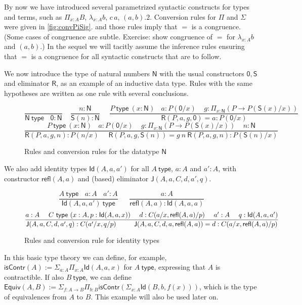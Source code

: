 \documentclass[11pt,a4paper]{article}
\theoremstyle{definition}
\newcommand{\Id}{\mathsf{Id}}
\newcommand{\NN}{\mathsf{N}}
\newcommand{\JJ}{\mathsf{J}}
\newcommand{\ZERO}{\mathsf{0}}
\newcommand{\SUCC}{\mathsf{S}}
\newcommand{\type}{\mathsf{type}}
\newcommand{\mylam}[3]{\lambda_{#1:#2}#3}
\newcommand{\mypi}[3]{\Pi_{#1:#2}#3}
\newcommand{\mysig}[3]{\Sigma_{#1:#2}#3}
\newcommand{\app}[2]{{#1\,#2}} %
\newcommand{\Sapp}[1]{\sapp{\SUCC}{#1}}
\newcommand{\sapp}[2]{{#1(#2)}} %
\newcommand{\Idapp}[3]{\sapp{\Id}{#1,#2,#3}}
\newcommand{\NRapp}[4]{\sapp{\RR}{#1,#2,#3,#4}}
\newcommand{\Rfapp}[2]{\sapp{\refl}{#1,#2}}
\newcommand{\Japp}[6]{\sapp{\JJ}{#1,#2,#3,#4,#5,#6}}
\newcommand{\RR}{\mathsf{R}}
\newcommand{\Equiv}{\mathsf{Equiv}}
\newcommand{\isContr}{\mathsf{isContr}}
\newcommand{\refl}{\mathsf{refl}}
\begin{document}
By now we have introduced several parametrized syntactic constructs
for types and terms, such as $\mypi{x}{A}{B}$,
$\mylam{x}{A}{b}$, $\app{c}{a}$, $(a,b).2$.
Conversion rules for $\Pi$ and $\Sigma$ were given in \cref{fig:convPiSig}.
and those rules imply that $=$ is a congruence.%
(Some cases of congruence are subtle. Exercise:
show congruence of $=$ for $\mylam{x}{A}{b}$ and $(a,b)$.)
In the sequel we will tacitly assume the inference rules
ensuring that $=$ is a congruence for all syntactic constructs
that are to follow.

We now introduce the type of natural numbers $\NN$ with
the usual constructors $\ZERO,\SUCC$ and eliminator $\RR$,
as an example of an inductive data type.
Rules with the same hypotheses are written as one rule with
several conclusions.

\begin{figure}[H]
  \caption{Rules and conversion rules for the datatype $\NN$}\label{fig:typeN}
$$
\frac{}{\NN~\type~~~~\ZERO:\NN}~~~~~
\frac{n:\NN}{\Sapp{n} : \NN}~~~~~~
\frac{P~\type~(x:\NN)~~~~a:P(\ZERO/x)~~~~~
g:\mypi{x}{\NN}{(P\to P(\Sapp{x}/x))}}
{\NRapp{P}{a}{g}{\ZERO} = a: P(\ZERO/x) }
$$
$$
\frac{P~\type~(x:\NN)~~~~a:P(\ZERO/x)~~~~~
g:\mypi{x}{\NN}{(P\to P(\Sapp{x}/x))}~~~~~n:\NN}
{\NRapp{P}{a}{g}{n}:P(n/x)~~~~~~\NRapp{P}{a}{g}{\Sapp{n}} = g~n~\NRapp{P}{a}{g}{n}: P(\Sapp{n}/x) }
$$
\end{figure}

We also add identity types $\Idapp{A}{a}{a'}$ for all $A~\type$,
$a:A$ and $a':A$, with constructor $\Rfapp{A}{a}$ and (based) eliminator
$\Japp{A}{a}{C}{d}{a'}{q}$.

\begin{figure}[H]
  \caption{Rules and conversion rule for identity types}\label{fig:typeId}
$$
\frac{A~\type ~~~~ a:A ~~~~ a':A}{\Idapp{A}{a}{a'}~\type}~~~~~~~
\frac{a:A}{\Rfapp{A}{a}:\Idapp{A}{a}{a}}
$$
$$
\frac{a:A~~~~C~\type~(x:A,p:\Idapp{A}{a}{x})~~~~d:C(a/x,\Rfapp{A}{a}/p)
~~~~a':A~~~~q:\Idapp{A}{a}{a'}}
{\Japp{A}{a}{C}{d}{a'}{q}: C(a'/x,q/p) ~~~~~~~~
 \Japp{A}{a}{C}{d}{a}{\Rfapp{A}{a}} = d : C(a/x,\Rfapp{A}{a}/p)}
\belowdisplayshortskip 0pt
$$
\end{figure}

In this basic type theory we can define, for example,
$\isContr(A) := \mysig{a}{A}{\mypi{x}{A}{\Id(A,a,x)}}$
for $A~\type$, expressing that $A$ is contractible.
If also $B~\type$, we can define $\Equiv(A,B) :=
\mysig{f}{A\to B}{\mypi{b}{B}{\isContr(\mysig{x}{A}{\Id(B,b,f(x))})}}$,
which is the type of equivalences from $A$ to $B$. This example
will also be used later on.
\end{document}
